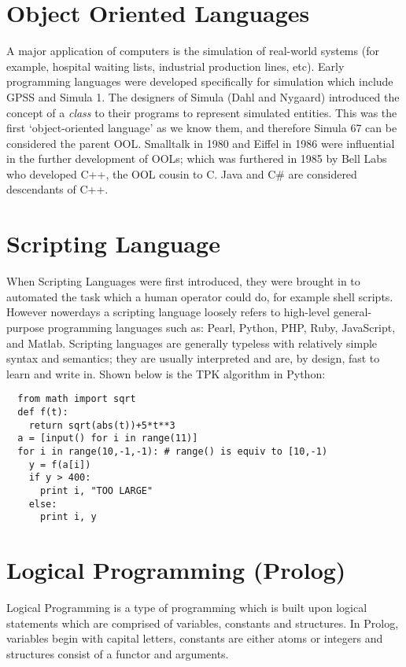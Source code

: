 \section{Object Oriented Languages}
A major application of computers is the simulation of real-world systems (for example, hospital waiting lists, industrial production lines, etc). Early programming languages were developed specifically for simulation which include GPSS and Simula 1. The designers of Simula (Dahl and Nygaard) introduced the concept of a \textit{class} to their programs to represent simulated entities. This was the first `object-oriented language' as we know them, and therefore Simula 67 can be considered the parent OOL. Smalltalk in 1980 and Eiffel in 1986 were influential in the further development of OOLs; which was furthered in 1985 by Bell Labs who developed C++, the OOL cousin to C. Java and C\# are considered descendants of C++. 

\section{Scripting Language}
When Scripting Languages were first introduced, they were brought in to automated the task which a human operator could do, for example shell scripts. However nowerdays a scripting language loosely refers to high-level general-purpose programming languages such as: Pearl, Python, PHP, Ruby, JavaScript, and Matlab. Scripting languages are generally typeless with relatively simple syntax and semantics; they are usually interpreted and are, by design, fast to learn and write in. Shown below is the TPK algorithm in Python:
\begin{verbatim}
  from math import sqrt
  def f(t):
    return sqrt(abs(t))+5*t**3
  a = [input() for i in range(11)]
  for i in range(10,-1,-1): # range() is equiv to [10,-1)
    y = f(a[i])
    if y > 400:
      print i, "TOO LARGE"
    else:
      print i, y
\end{verbatim}

\section{Logical Programming (Prolog)}
Logical Programming is a type of programming which is built upon logical statements which are comprised of variables, constants and structures. In Prolog, variables begin with capital letters, constants are either atoms or integers and structures consist of a functor and arguments.\\

